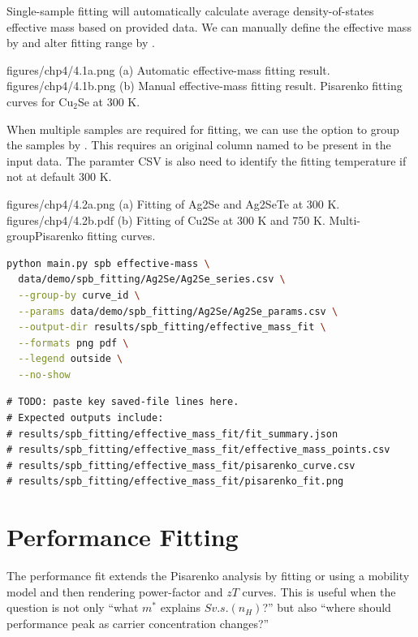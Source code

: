 Single-sample fitting will automatically calculate average density-of-states effective mass based on provided data. We can manually 
define the effective mass by  and alter fitting range by .

\twofigureslot
  {figures/chp4/4.1a.png}
  {(a) Automatic effective-mass fitting result.}
  {figures/chp4/4.1b.png}
  {(b) Manual effective-mass fitting result.}
  {Pisarenko fitting curves for Cu$_{2}$Se at 300 K.}

When multiple samples are required for fitting, we can use the  option to group the samples 
by . This requires an original column named  to be present in the input data. The paramter CSV is also need
to identify the fitting temperature if not at default 300 K.

\twofigureslot
  {figures/chp4/4.2a.png}
  {(a) Fitting of Ag2Se and Ag2SeTe at 300 K.}
  {figures/chp4/4.2b.pdf}
  {(b) Fitting of Cu2Se at 300 K and 750 K.}
  {Multi-groupPisarenko fitting curves.}

\begin{lstlisting}[language=bash,caption={Command slot: SPB effective-mass fit.}]
python main.py spb effective-mass \
  data/demo/spb_fitting/Ag2Se/Ag2Se_series.csv \
  --group-by curve_id \
  --params data/demo/spb_fitting/Ag2Se/Ag2Se_params.csv \
  --output-dir results/spb_fitting/effective_mass_fit \
  --formats png pdf \
  --legend outside \
  --no-show
\end{lstlisting}

\begin{lstlisting}[caption={Terminal-output slot: effective-mass fit.}]
# TODO: paste key saved-file lines here.
# Expected outputs include:
# results/spb_fitting/effective_mass_fit/fit_summary.json
# results/spb_fitting/effective_mass_fit/effective_mass_points.csv
# results/spb_fitting/effective_mass_fit/pisarenko_curve.csv
# results/spb_fitting/effective_mass_fit/pisarenko_fit.png
\end{lstlisting}


\section{Performance Fitting}

The performance fit extends the Pisarenko analysis by fitting or using a
mobility model and then rendering power-factor and $zT$ curves. This is useful
when the question is not only ``what $m^*$ explains $S v.s. (n_H)$?'' but also
``where should performance peak as carrier concentration changes?''

